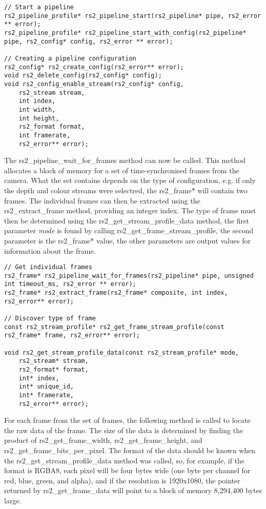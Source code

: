     \begin{lstlisting}[style=CStyle]
// Start a pipeline
rs2_pipeline_profile* rs2_pipeline_start(rs2_pipeline* pipe, rs2_error ** error);
rs2_pipeline_profile* rs2_pipeline_start_with_config(rs2_pipeline* pipe, rs2_config* config, rs2_error ** error);

// Creating a pipeline configuration
rs2_config* rs2_create_config(rs2_error** error);
void rs2_delete_config(rs2_config* config);
void rs2_config_enable_stream(rs2_config* config,
    rs2_stream stream,
    int index,
    int width,
    int height,
    rs2_format format,
    int framerate,
    rs2_error** error);\end{lstlisting}

    The rs2\_pipeline\_wait\_for\_frames method can now be called. This method allocates a block of memory for a set of time-synchronised frames from the camera. What the set contains depends on the type of configuration, e.g. if only the depth and colour streams were selectred, the rs2\_frame* will contain two frames. The individual frames can then be extracted using the rs2\_extract\_frame method, providing an integer index. The type of frame must then be determined using the rs2\_get\_stream\_profile\_data method, the first parameter {\slshape mode} is found by calling rs2\_get\_frame\_stream\_profile, the second parameter is the rs2\_frame* value, the other parameters are output values for information about the frame.

    \begin{lstlisting}[style=CStyle]
// Get individual frames
rs2_frame* rs2_pipeline_wait_for_frames(rs2_pipeline* pipe, unsigned int timeout_ms, rs2_error ** error);
rs2_frame* rs2_extract_frame(rs2_frame* composite, int index, rs2_error** error);

// Discover type of frame
const rs2_stream_profile* rs2_get_frame_stream_profile(const rs2_frame* frame, rs2_error** error);

void rs2_get_stream_profile_data(const rs2_stream_profile* mode, 
    rs2_stream* stream, 
    rs2_format* format, 
    int* index, 
    int* unique_id, 
    int* framerate, 
    rs2_error** error);\end{lstlisting}

    For each frame from the set of frames, the following method is called to locate the raw data of the frame. The size of the data is determined by finding the product of rs2\_get\_frame\_width, rs2\_get\_frame\_height, and rs2\_get\_frame\_bits\_per\_pixel. The format of the data should be known when the rs2\_get\_stream\_profile\_data method was called, so, for example, if the format is RGBA8, each pixel will be four bytes wide (one byte per channel for red, blue, green, and alpha), and if the resolution is 1920x1080, the pointer returned by rs2\_get\_frame\_data will point to a block of memory 8,294,400 bytes large.


